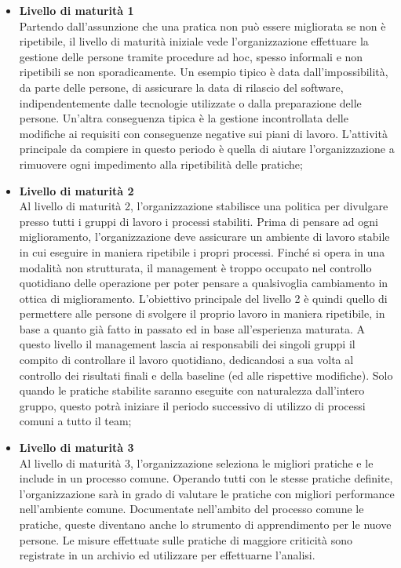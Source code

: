 \begin{itemize}
\item \textbf{Livello di maturità 1}\\
Partendo dall'assunzione che una pratica non può essere migliorata se non è ripetibile, il livello di maturità iniziale vede l'organizzazione effettuare la gestione delle persone tramite procedure ad hoc, spesso informali e non ripetibili se non sporadicamente. Un esempio tipico è data dall'impossibilità, da parte delle persone, di assicurare la data di rilascio del software, indipendentemente dalle tecnologie utilizzate o dalla preparazione delle persone. Un'altra conseguenza tipica è la gestione incontrollata delle modifiche ai requisiti con conseguenze negative sui piani di lavoro.
L'attività principale da compiere in questo periodo è quella di aiutare l'organizzazione a rimuovere ogni impedimento alla ripetibilità delle pratiche;
\item \textbf{Livello di maturità 2}\\
Al livello di maturità 2, l'organizzazione stabilisce una politica per divulgare presso tutti i gruppi di lavoro i processi stabiliti. Prima di pensare ad ogni miglioramento, l'organizzazione deve assicurare un ambiente di lavoro stabile in cui eseguire in maniera ripetibile i propri processi. Finché si opera in una modalità non strutturata, il management è troppo occupato nel controllo quotidiano delle operazione per poter pensare a qualsivoglia cambiamento in ottica di miglioramento. L'obiettivo principale del livello 2 è quindi quello di permettere alle persone di svolgere il proprio lavoro in maniera ripetibile, in base a quanto già fatto in passato ed in base all'esperienza maturata. A questo livello il management lascia ai responsabili dei singoli gruppi il compito di controllare il lavoro quotidiano, dedicandosi a sua volta al controllo dei risultati finali e della baseline (ed alle rispettive modifiche).
Solo quando le pratiche stabilite saranno eseguite con naturalezza dall'intero gruppo, questo potrà iniziare il periodo successivo di utilizzo di processi comuni a tutto il team;
\item \textbf{Livello di maturità 3}\\
Al livello di maturità 3, l'organizzazione seleziona le migliori pratiche e le include in un processo comune. Operando tutti con le stesse pratiche definite, l'organizzazione sarà in grado di valutare le pratiche con migliori performance nell'ambiente comune. Documentate nell'ambito del processo comune le pratiche, queste diventano anche lo strumento di apprendimento per le nuove persone. Le misure effettuate sulle pratiche di maggiore criticità sono registrate in un archivio ed utilizzare per effettuarne l'analisi.

\end{itemize}
